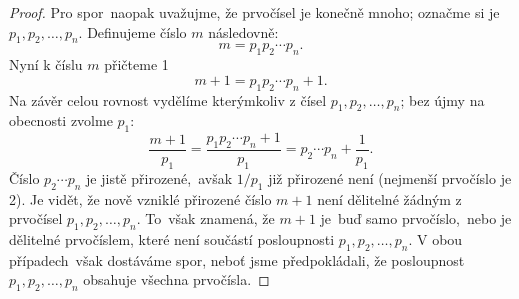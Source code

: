 \begin{proof}
    Pro spor~naopak uvažujme, že prvočísel je konečně mnoho; označme si je $p_1, p_2, \dots, p_n$. Definujeme číslo $m$ následovně:
    \begin{equation*}
        m=p_1p_2\cdots p_n.
    \end{equation*}
    Nyní k číslu $m$ přičteme 1
    \begin{equation*}
        m+1=p_1p_2\cdots p_n+1.
    \end{equation*}
    Na závěr celou rovnost vydělíme kterýmkoliv z čísel $p_1, p_2, \dots, p_n$; bez újmy na obecnosti zvolme $p_1$:
    \begin{equation*}
        \dfrac{m+1}{p_1}=\dfrac{p_1p_2\cdots p_n+1}{p_1}=p_2\cdots p_n+\dfrac{1}{p_1}.
    \end{equation*}
    Číslo $p_2\cdots p_n$ je jistě přirozené,~avšak $1/p_1$ již přirozené není (nejmenší prvočíslo je 2). Je vidět, že nově vzniklé přirozené číslo $m+1$ není dělitelné žádným z prvočísel $p_1, p_2, \dots, p_n$. To~však znamená, že $m+1$ je~buď samo prvočíslo,~nebo je dělitelné prvočíslem, které není součástí posloupnosti $p_1, p_2, \dots, p_n$. V obou případech~však dostáváme spor, neboť jsme předpokládali, že posloupnost $p_1, p_2, \dots, p_n$ obsahuje všechna prvočísla.
\end{proof}

